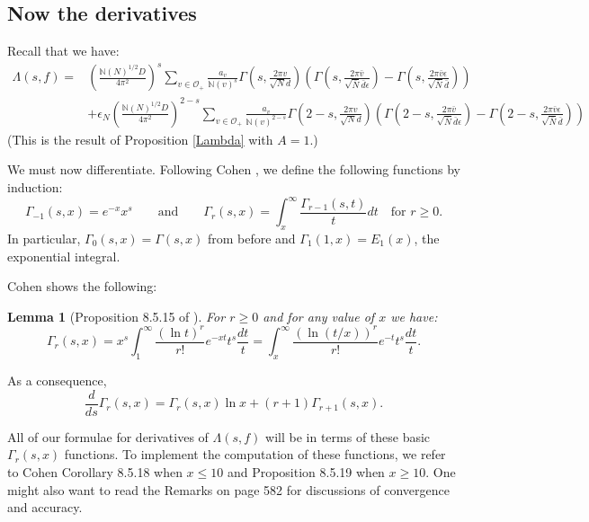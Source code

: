 \documentclass{article}
\theoremstyle{plain}
\newtheorem{lemma}{Lemma}
\begin{document}
\subsection{Now the derivatives}

Recall that we have:
\begin{equation*}
\begin{split}
\Lambda(s,f)=& \left(\frac{\mathbb{N}(N)^{1/2}D}{4\pi^2}\right)^s \sum_{v \in \mathcal{O}_+} \frac{a_v}{\mathbb{N}(v)^s} \Gamma\left(s, \frac{2\pi v }{\sqrt{N}d}\right) \left(\Gamma\left(s,\frac{2 \pi \bar{v}}{\sqrt{\bar{N}}\bar{d} \epsilon} \right)-  \Gamma\left(s,\frac{2 \pi \bar{v}\epsilon}{\sqrt{\bar{N}}\bar{d} } \right) \right) \\
&+ \epsilon_N \left(\frac{\mathbb{N}(N)^{1/2}D}{4\pi^2}\right)^{2-s}\sum_{v \in \mathcal{O}_+} \frac{a_v}{\mathbb{N}(v)^{2-s}} \Gamma\left(2-s, \frac{2\pi v }{\sqrt{N}d}\right) \left(\Gamma\left(2-s,\frac{2 \pi \bar{v}}{\sqrt{\bar{N}}\bar{d} \epsilon} \right)-  \Gamma\left(2-s,\frac{2 \pi \bar{v}\epsilon}{\sqrt{\bar{N}}\bar{d} } \right) \right)
\end{split}
\end{equation*}
(This is the result of Proposition \ref{Lambda} with $A=1$.)

We must now differentiate. Following Cohen \cite[Definition 8.5.12]{cohen}, we define the following functions by induction:
\begin{equation*}
\Gamma_{-1}(s,x)= e^{-x}x^s \qquad \text{and} \qquad \Gamma_r(s,x) = \int_x^{\infty}\frac{\Gamma_{r-1}(s,t)}{t}dt \quad \text{for } r\geq 0.
\end{equation*}
In particular, $\Gamma_0(s,x)=\Gamma(s,x)$ from before and $\Gamma_1(1,x)=E_1(x)$, the exponential integral.

Cohen shows the following:
\begin{lemma}[Proposition 8.5.15 of \cite{cohen}]
For $r \geq 0$ and for any value of $x$ we have:
\begin{equation*}
\Gamma_r(s,x)=x^s \int_1^{\infty} \frac{(\ln t)^r}{r!}e^{-xt} t^s \frac{dt}{t}=\int_x^{\infty} \frac{(\ln(t/x))^r}{r!}e^{-t}t^s \frac{dt}{t}.
\end{equation*}
\end{lemma}

As a consequence, 
\begin{equation*}
\frac{d}{ds} \Gamma_r(s,x)= \Gamma_r(s,x) \ln x +(r+1)\Gamma_{r+1}(s,x).
\end{equation*}

All of our formulae for derivatives of $\Lambda(s,f)$ will be in terms of these basic $\Gamma_r(s,x)$ functions. To implement the computation of these functions, we refer to Cohen \cite{cohen} Corollary 8.5.18 when $x \leq 10$ and Proposition 8.5.19 when $x \geq 10$. One might also want to read the Remarks on page 582 for discussions of convergence and accuracy.
\end{document}
